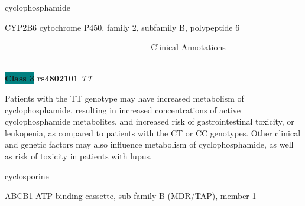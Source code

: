 \documentclass{resume} %
\begin{document}
\begin{rSection}{ cyclophosphamide }
\begin{rSubsection}{ CYP2B6 }{ cytochrome P450, family 2, subfamily B, polypeptide 6 }{}{}
\item[] ---------------------------------------------------- Clinical Annotations -----------------------------------------------------\newline
\item \textbf{\colorbox{teal} {Class 3}} \textbf{ rs4802101 } \textit{ TT }
\item[] Patients with the TT genotype may have increased metabolism of cyclophosphamide, resulting in increased concentrations of active cyclophosphamide metabolites, and increased risk of gastrointestinal toxicity, or leukopenia, as compared to patients with the CT or CC genotypes. Other clinical and genetic factors may also influence metabolism of cyclophosphamide, as well as risk of toxicity in patients with lupus.
\end{rSubsection}

\end{rSection}\begin{rSection}{ cyclosporine }
\item[]

\begin{rSubsection}{ ABCB1 }{ ATP-binding cassette, sub-family B (MDR/TAP), member 1 }{}{}
\item[]


\end{rSubsection}
\end{rSection}
\end{document}
